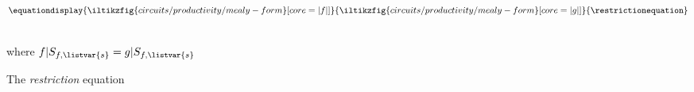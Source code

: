\begin{figure}
    \centering
    \(\equationdisplay{
        \iltikzfig{circuits/productivity/mealy-form}[core=|f|]
    }{
        \iltikzfig{circuits/productivity/mealy-form}[core=|g|]
    }{\restrictionequation}\)
    \,\,
    \begin{minipage}{0.25\textwidth}
        \centering
        where \(f|S_{f,\listvar{s}} = g|S_{f,\listvar{s}}\)
    \end{minipage}
    \caption{The \emph{restriction} equation}
    \label{fig:restriction-equation}
\end{figure}